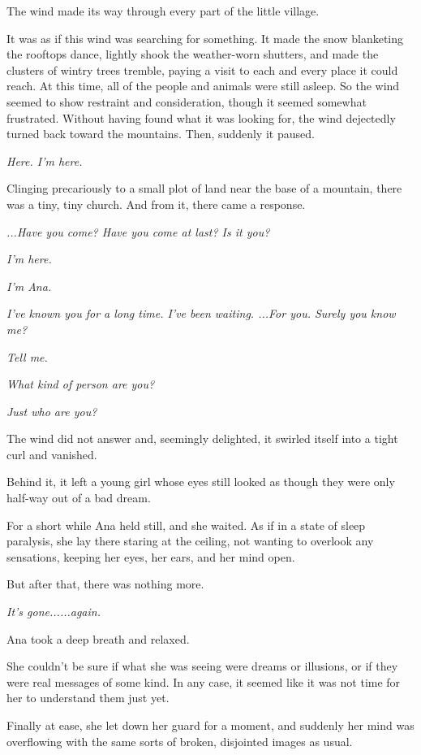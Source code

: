 \documentclass[
]{article}
\begin{document}
The wind made its way through every part of the little village.

It was as if this wind was searching for something. It made the snow
blanketing the rooftops dance, lightly shook the weather-worn shutters,
and made the clusters of wintry trees tremble, paying a visit to each
and every place it could reach. At this time, all of the people and
animals were still asleep. So the wind seemed to show restraint and
consideration, though it seemed somewhat frustrated. Without having
found what it was looking for, the wind dejectedly turned back toward
the mountains. Then, suddenly it paused.

\emph{Here. I'm here.}

Clinging precariously to a small plot of land near the base of a
mountain, there was a tiny, tiny church. And from it, there came a
response.

\emph{...Have you come? Have you come at last? Is it you?}

\emph{I'm here.}

\emph{I'm Ana.}

\emph{I've known you for a long time. I've been waiting. ...For you.
Surely you know me?}

\emph{Tell me.}

\emph{What kind of person are you?}

\emph{Just who are you?}

The wind did not answer and, seemingly delighted, it swirled itself into
a tight curl and vanished.

Behind it, it left a young girl whose eyes still looked as though they
were only half-way out of a bad dream.

For a short while Ana held still, and she waited. As if in a state of
sleep paralysis, she lay there staring at the ceiling, not wanting to
overlook any sensations, keeping her eyes, her ears, and her mind open.

But after that, there was nothing more.

\emph{It's gone......again.}

Ana took a deep breath and relaxed.

She couldn't be sure if what she was seeing were dreams or illusions, or
if they were real messages of some kind. In any case, it seemed like it
was not time for her to understand them just yet.

Finally at ease, she let down her guard for a moment, and suddenly her
mind was overflowing with the same sorts of broken, disjointed images as
usual.
\end{document}
